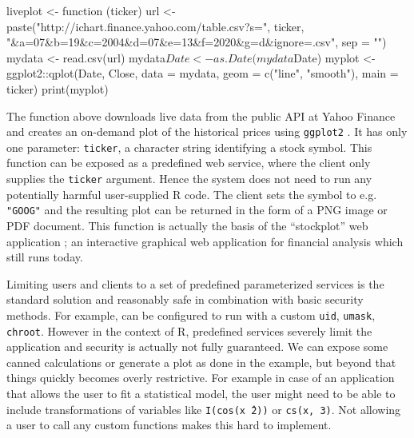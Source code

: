 \documentclass{jss}
\newcommand{\R}{\textsf{R}\xspace}
\begin{document}
\begin{CodeChunk}
\begin{CodeInput} 
liveplot <- function (ticker) {
  url <- paste("http://ichart.finance.yahoo.com/table.csv?s=",
    ticker, "&a=07&b=19&c=2004&d=07&e=13&f=2020&g=d&ignore=.csv",
    sep = "")
  mydata <- read.csv(url)
  mydata$Date <- as.Date(mydata$Date)
  myplot <- ggplot2::qplot(Date, Close, data = mydata, geom = c("line",
    "smooth"), main = ticker)
  print(myplot)
}
\end{CodeInput}
\end{CodeChunk}

The function above downloads live data from the public API at Yahoo Finance and
creates an on-demand plot of the historical prices using \texttt{ggplot2}
\citep{ggplot2}. It has only one parameter: \texttt{ticker},
a character string identifying a stock symbol. This function can be exposed as a
predefined web service, where the client only supplies the \texttt{ticker}
argument. Hence the system does not need to run any potentially harmful
user-supplied \R code. The client sets the symbol to e.g.
\texttt{"GOOG"} and the resulting plot can be returned in the form of a
PNG image or PDF document. This function is actually the basis of the
``stockplot'' web application \citep{stockplot}; an interactive graphical web
application for financial analysis which still runs today.

Limiting users and clients to a set of predefined parameterized services is the
standard solution and reasonably safe in combination with basic security
methods. For example,  can be configured to run with a custom
\texttt{uid}, \texttt{umask}, \texttt{chroot}. However in the context of \R,
predefined services severely limit the application and security is actually not
fully guaranteed. We can expose some canned calculations or generate a plot as
done in the example, but beyond that things quickly becomes overly restrictive.
For example in case of an application that allows the user to fit a statistical
model, the user might need to be able to include transformations of variables
like \texttt{I(cos(x\^\ 2))} or \texttt{cs(x, 3)}. Not allowing a user to call
any custom functions makes this hard to implement.
\end{document}
